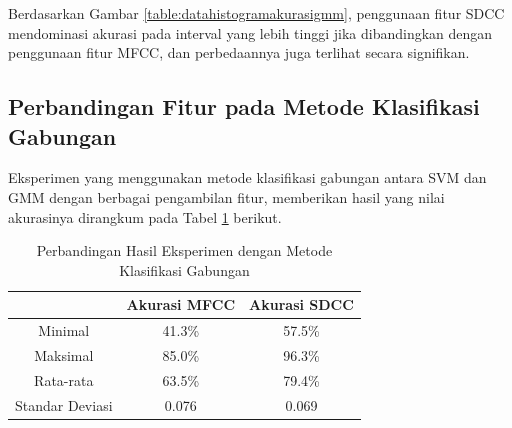   Berdasarkan Gambar \ref{table:datahistogramakurasigmm}, penggunaan fitur SDCC mendominasi akurasi pada interval yang lebih tinggi jika dibandingkan dengan penggunaan fitur MFCC, dan perbedaannya juga terlihat secara signifikan.





  
  \subsection{Perbandingan Fitur pada Metode Klasifikasi Gabungan}
  Eksperimen yang menggunakan metode klasifikasi gabungan antara SVM dan GMM dengan berbagai pengambilan fitur, memberikan hasil yang nilai akurasinya dirangkum pada Tabel \ref{table:perbandingangabungan} berikut.

  \begin{table}
    \centering
    \caption{Perbandingan Hasil Eksperimen dengan Metode Klasifikasi Gabungan}
    \begin{tabular}{|c|c|c|}
      \hline
       & Akurasi MFCC & Akurasi SDCC \\ \hline
      Minimal         & 41.3\% & 57.5\% \\ \hline
      Maksimal        & 85.0\% & 96.3\% \\ \hline
      Rata-rata       & 63.5\% & 79.4\% \\ \hline
      Standar Deviasi & 0.076  & 0.069  \\ \hline
    \end{tabular}
    \label{table:perbandingangabungan}
  \end{table}

